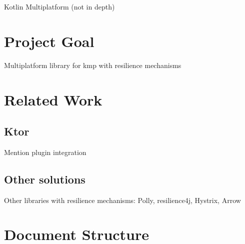 Kotlin Multiplatform (not in depth)


\section{Project Goal}\label{sec:project-goal}

Multiplatform library for kmp with resilience mechanisms


\section{Related Work}\label{sec:related-work}

\subsection{Ktor}\label{subsec:ktor}
Mention plugin integration

\subsection{Other solutions}\label{subsec:other-solutions}
Other libraries with resilience mechanisms: Polly, resilience4j, Hystrix, Arrow


\section{Document Structure}\label{sec:document-structure}
